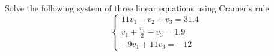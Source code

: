 \documentclass[a4paper, 12pt]{report}
\def\ni{blue!20!white}
\begin{document}
    \newpage
    \begin{tcolorbox}[title=\color{black}{\section{Q5}}, colback=white, colframe=\ni, boxrule=1mm, width=1\textwidth]
        Solve the following system of three linear equations using Cramer's rule
        \[
        \left\{\begin{array}{c}
            11 v_{1}-v_{2}+v_{3}=31.4 \\
            v_{1}+\frac{v_{2}}{2}-v_{3}=1.9 \\
            -9 v_{1}+11 v_{3}=-12
        \end{array}\right.
        \]
    \end{tcolorbox}
    
\end{document}
